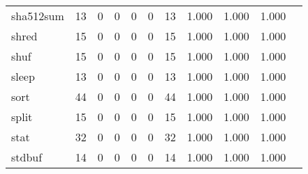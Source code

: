 \begin{longtable}{lp{1.10cm}p{1.10cm}p{1.10cm}p{1.10cm}p{1.10cm}p{1.10cm}p{1.10cm}p{1.10cm}p{1.10cm}p{1.10cm}}
sha512sum &                     13 &                                  0 &                                 0 &                                0 &                                 0 &                              13 &                          1.000 &                                 1.000 &                               1.000 \\
shred     &                     15 &                                  0 &                                 0 &                                0 &                                 0 &                              15 &                          1.000 &                                 1.000 &                               1.000 \\
shuf      &                     15 &                                  0 &                                 0 &                                0 &                                 0 &                              15 &                          1.000 &                                 1.000 &                               1.000 \\
sleep     &                     13 &                                  0 &                                 0 &                                0 &                                 0 &                              13 &                          1.000 &                                 1.000 &                               1.000 \\
sort      &                     44 &                                  0 &                                 0 &                                0 &                                 0 &                              44 &                          1.000 &                                 1.000 &                               1.000 \\
split     &                     15 &                                  0 &                                 0 &                                0 &                                 0 &                              15 &                          1.000 &                                 1.000 &                               1.000 \\
stat      &                     32 &                                  0 &                                 0 &                                0 &                                 0 &                              32 &                          1.000 &                                 1.000 &                               1.000 \\
stdbuf    &                     14 &                                  0 &                                 0 &                                0 &                                 0 &                              14 &                          1.000 &                                 1.000 &                               1.000 \\

\end{longtable}
